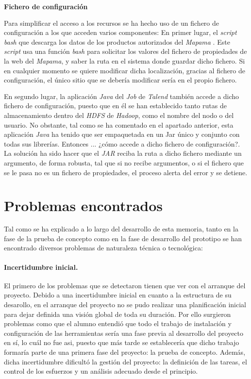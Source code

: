 \bigskip

\par 
\textbf{Fichero de configuración}
\par
Para simplificar el acceso a los recursos se ha hecho uso de un fichero de configuración a los que acceden varios componentes: En primer lugar, el \textit{script bash} que descarga los datos de los productos autorizados del \textit{Mapama} \cite{mapama}. Este \textit{script} usa una función \textit{bash} para solicitar los valores del fichero de propiedades de la web del \textit{Mapama}, y saber la ruta en el sistema donde guardar dicho fichero. Si en cualquier momento se quiere modificar dicha localización, gracias al fichero de configuración, el único sitio que se debería modificar sería en el propio fichero. 
\par En segundo lugar, la aplicación \textit{Java} del \textit{Job} de \textit{Talend} también accede a dicho fichero de configuración, puesto que en él se han establecido tanto rutas de almacenamiento dentro del \textit{HDFS} de \textit{Hadoop}, como el nombre del nodo o del usuario. No obstante, tal como se ha comentado en el apartado anterior, esta aplicación \textit{Java} ha tenido que ser empaquetada en un Jar único y conjunto con todas sus librerías. Entonces ... ¿cómo accede a dicho fichero de configuración?. La solución ha sido hacer que el \textit{JAR} reciba la ruta a dicho fichero mediante un argumento, de forma robusta, tal que si no recibe argumentos, o si el fichero que se le pasa no es un fichero de propiedades, el proceso alerta del error y se detiene. 
\bigskip


\section{Problemas encontrados} \label{implementacion.problemas}
\par
Tal como se ha explicado a lo largo del desarrollo de esta memoria, tanto en la fase de la prueba de concepto como en la fase de desarrollo del prototipo se han encontrado diversos problemas de naturaleza técnica o tecnológica:

\paragraph*{Incertidumbre inicial.} El primero de los problemas que se detectaron tienen que ver con el arranque del proyecto. Debido a una incertidumbre inicial en cuanto a la estructura de su desarollo, en el arranque del proyecto no se pudo realizar una planificación inicial para dejar definida una visión global de toda su duración. Por ello surgieron problemas como que el alumno entendió que todo el trabajo de instalación y configuración de las herramientas sería una fase previa al desarrollo del proyecto en sí, lo cuál no fue asi, puesto que más tarde se establecería que dicho trabajo formaría parte de una primera fase del proyecto: la prueba de concepto. Además, dicha incertidumbre dificultó la gestión del proyecto: la definición de las tareas, el control de los esfuerzos y un análisis adecuado desde el principio.

